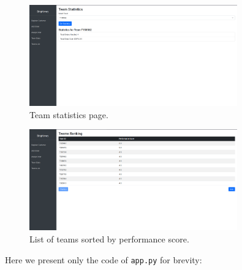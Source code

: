 \begin{figure}[H]
    \centering
    \includegraphics[width=0.8\textwidth]{img/web_app/stats.png}
    \caption{Team statistics page.}
\end{figure}

\begin{figure}[H]
    \centering
    \includegraphics[width=0.8\textwidth]{img/web_app/list.png}
    \caption{List of teams sorted by performance score.}
\end{figure}

Here we present only the code of \texttt{app.py} for brevity:

